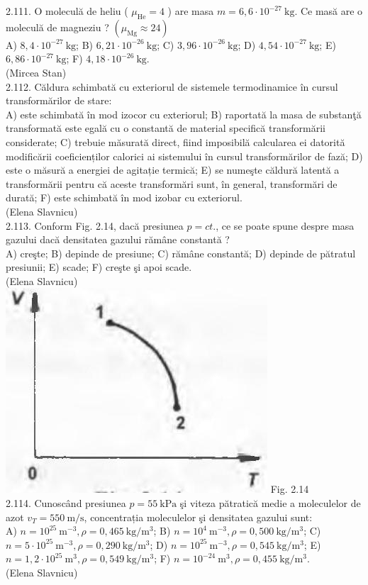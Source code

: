2.111. O moleculă de heliu ( $\mu_{\mathrm{He}}=4$ ) are masa $m=6,6 \cdot 10^{-27} \mathrm{~kg}$. Ce masă are o moleculă de magneziu ? $\left(\mu_{\mathrm{Mg}} \approx 24\right)$\\ A) $8,4 \cdot 10^{-27} \mathrm{~kg}$; B) $6,21 \cdot 10^{-26} \mathrm{~kg}$; C) $3,96 \cdot 10^{-26} \mathrm{~kg}$; D) $4,54 \cdot 10^{-27} \mathrm{~kg}$; E) $6,86 \cdot 10^{-27} \mathrm{~kg}$; F) $4,18 \cdot 10^{-26} \mathrm{~kg}$.\\ (Mircea Stan)\\

2.112. Căldura schimbată cu exteriorul de sistemele termodinamice în cursul transformărilor de stare:\\ A) este schimbată în mod izocor cu exteriorul; B) raportată la masa de substanţă transformată este egală cu o constantă de material specifică transformării considerate; C) trebuie măsurată direct, fiind imposibilă calcularea ei datorită modificării coeficienților calorici ai sistemului în cursul transformărilor de fază; D) este o măsură a energiei de agitație termică; E) se numeşte căldură latentă a transformării pentru că aceste transformări sunt, în general, transformări de durată; F) este schimbată în mod izobar cu exteriorul.\\ (Elena Slavnicu)\\

2.113. Conform Fig. 2.14, dacă presiunea $p=ct.$, ce se poate spune despre masa gazului dacă densitatea gazului rămâne constantă ?\\ A) creşte; B) depinde de presiune; C) rămâne constantă; D) depinde de pătratul presiunii; E) scade; F) creşte şi apoi scade.\\ (Elena Slavnicu)\\ \includegraphics[width=0.4\linewidth]{images/2025_07_01_5b3ff9fa0d508c8e9f17g-098} Fig. 2.14\\

2.114. Cunoscând presiunea $p=55 \mathrm{~kPa}$ şi viteza pătratică medie a moleculelor de azot $v_{T}=550 \mathrm{~m} / \mathrm{s}$, concentrația moleculelor şi densitatea gazului sunt:\\ A) $n=10^{25} \mathrm{~m}^{-3} , \rho=0,465 \mathrm{~kg} / \mathrm{m}^{3}$; B) $n=10^{4} \mathrm{~m}^{-3} , \rho=0,500 \mathrm{~kg} / \mathrm{m}^{3}$; C) $n=5 \cdot 10^{25} \mathrm{~m}^{-3} , \rho=0,290 \mathrm{~kg} / \mathrm{m}^{3}$; D) $n=10^{25} \mathrm{~m}^{-3} , \rho=0,545 \mathrm{~kg} / \mathrm{m}^{3}$; E) $n=1,2 \cdot 10^{25} \mathrm{~m}^{3} , \rho=0,549 \mathrm{~kg} / \mathrm{m}^{3}$; F) $n=10^{-24} \mathrm{~m}^{3} , \rho=0,455 \mathrm{~kg} / \mathrm{m}^{3}$.\\ (Elena Slavnicu)\\

